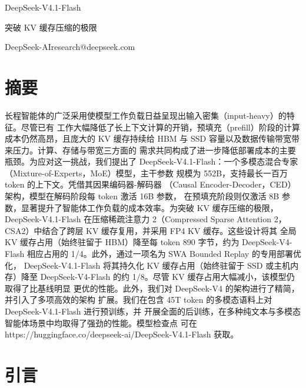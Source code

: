 \documentclass[
  10
]{article}
\author{}
\date{}
\begin{document}
\renewcommand{\figurename}{图}
\renewcommand{\tablename}{表}




\begin{center}
{\LARGE DeepSeek-V4.1-Flash\par}
\vspace{0.5em}
{\large 突破 KV 缓存压缩的极限\par}
\vspace{0.8em}
{\normalsize DeepSeek-AI\quad research@deepseek.com\par}
\end{center}
\label{deepseek-v4.1-flash-pushing-the-limits-of-kv-cache-compression}



\renewcommand{\contentsname}{目录}
\tableofcontents
\clearpage
\section*{摘要}\label{abstract}

长程智能体的广泛采用使模型工作负载日益呈现出输入密集（input-heavy）的特征。尽管已有
工作大幅降低了长上下文计算的开销，预填充（prefill）阶段的计算成本仍然高昂，且庞大的
KV 缓存持续给 HBM 与 SSD 容量以及数据传输带宽带来压力。计算、存储与带宽三方面的
需求共同构成了进一步降低部署成本的主要瓶颈。为应对这一挑战，我们提出了
DeepSeek-V4.1-Flash：一个多模态混合专家（Mixture-of-Experts，MoE）模型，主干参数
规模为 552B，支持最长一百万 token 的上下文。凭借其因果编码器-解码器
（Causal Encoder-Decoder，CED）架构，模型在解码阶段每 token 激活 16B 参数，
在预填充阶段则仅激活 8B 参数，显著提升了智能体工作负载的成本效率。为突破 KV
缓存压缩的极限，DeepSeek-V4.1-Flash 在压缩稀疏注意力 2（Compressed Sparse
Attention 2，CSA2）中结合了跨层 KV 缓存复用，并采用 FP4 KV 缓存。这些设计将其
全局 KV 缓存占用（始终驻留于 HBM）降至每 token 890 字节，约为 DeepSeek-V4-
Flash 相应占用的 1/4。此外，通过一项名为 SWA Bounded Replay 的专用部署优化，
DeepSeek-V4.1-Flash 将其持久化 KV 缓存占用（始终驻留于 SSD 或主机内存）降至
DeepSeek-V4-Flash 的约 1/8。尽管 KV 缓存占用大幅减小，该模型仍取得了比基线明显
更优的性能。此外，我们对 DeepSeek-V4 的架构进行了精简，并引入了多项高效的架构
扩展。我们在包含 45T token 的多模态语料上对 DeepSeek-V4.1-Flash 进行预训练，并
开展全面的后训练，在多种纯文本与多模态智能体场景中均取得了强劲的性能。模型检查点
可在 https://huggingface.co/deepseek-ai/DeepSeek-V4.1-Flash 获取。

\section{引言}\label{introduction}
\end{document}

